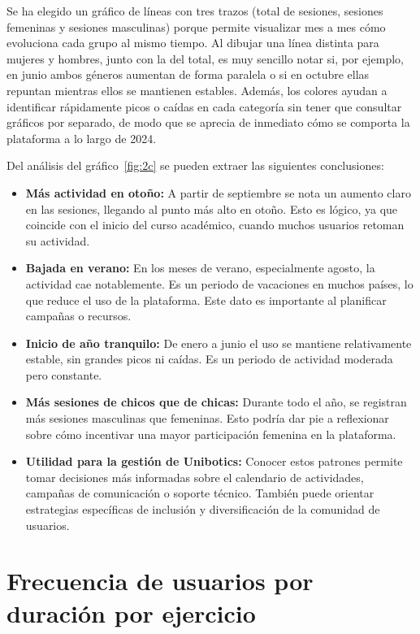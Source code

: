 \documentclass[a4paper, 12pt]{book}
\begin{document}
Se ha elegido un gráfico de líneas con tres trazos (total de sesiones, sesiones femeninas y sesiones masculinas) porque permite visualizar mes a mes cómo evoluciona cada grupo al mismo tiempo. Al dibujar una línea distinta para mujeres y hombres, junto con la del total, es muy sencillo notar si, por ejemplo, en junio ambos géneros aumentan de forma paralela o si en octubre ellas repuntan mientras ellos se mantienen estables. Además, los colores ayudan a identificar rápidamente picos o caídas en cada categoría sin tener que consultar gráficos por separado, de modo que se aprecia de inmediato cómo se comporta la plataforma a lo largo de 2024.

Del análisis del gráfico~\ref{fig:2c} se pueden extraer las siguientes conclusiones:

\begin{itemize}
  \item \textbf{Más actividad en otoño:} A partir de septiembre se nota un aumento claro en las sesiones, llegando al punto más alto en otoño. Esto es lógico, ya que coincide con el inicio del curso académico, cuando muchos usuarios retoman su actividad.

  \item \textbf{Bajada en verano:} En los meses de verano, especialmente agosto, la actividad cae notablemente. Es un periodo de vacaciones en muchos países, lo que reduce el uso de la plataforma. Este dato es importante al planificar campañas o recursos.

  \item \textbf{Inicio de año tranquilo:} De enero a junio el uso se mantiene relativamente estable, sin grandes picos ni caídas. Es un periodo de actividad moderada pero constante.

  \item \textbf{Más sesiones de chicos que de chicas:} Durante todo el año, se registran más sesiones masculinas que femeninas. Esto podría dar pie a reflexionar sobre cómo incentivar una mayor participación femenina en la plataforma.

  \item \textbf{Utilidad para la gestión de Unibotics:} Conocer estos patrones permite tomar decisiones más informadas sobre el calendario de actividades, campañas de comunicación o soporte técnico. También puede orientar estrategias específicas de inclusión y diversificación de la comunidad de usuarios.
\end{itemize}


\section{Frecuencia de usuarios por duración por ejercicio}
\label{sec:dash3a}
\end{document}

